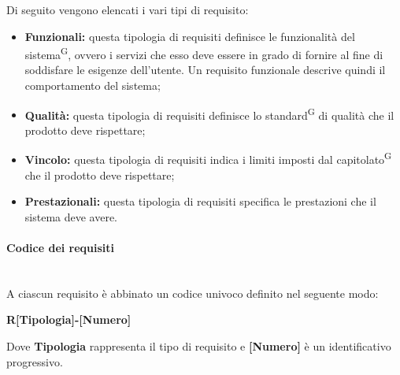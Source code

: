 \documentclass[8pt]{article}
\newcommand{\glossterm}[1]{#1\textsuperscript{G}} %
\newcommand{\subsubsubsection}[1]{\paragraph{#1}\mbox{}\\}
\begin{document}
Di seguito vengono elencati i vari tipi di requisito:
\begin{itemize} 
    \item \textbf{Funzionali:} questa tipologia di requisiti definisce le funzionalità del \glossterm{sistema}, ovvero i servizi che esso deve essere in grado di fornire al fine di soddisfare le esigenze dell'utente. Un requisito funzionale descrive quindi il comportamento del sistema;
    \item \textbf{Qualità:} questa tipologia di requisiti definisce lo \glossterm{standard} di qualità che il prodotto deve rispettare;
    \item \textbf{Vincolo:} questa tipologia di requisiti indica i limiti imposti dal \glossterm{capitolato} che il prodotto deve rispettare;
    \item \textbf{Prestazionali:} questa tipologia di requisiti specifica le prestazioni che il sistema deve avere. 
\end{itemize}

\subsubsubsection{Codice dei requisiti}
A ciascun requisito è abbinato un codice univoco definito nel seguente modo:
\begin{center}
    \textbf{R[Tipologia]-[Numero]}
\end{center}
Dove \textbf{Tipologia} rappresenta il tipo di requisito e \textbf{[Numero]} è un identificativo progressivo.

\end{document}
